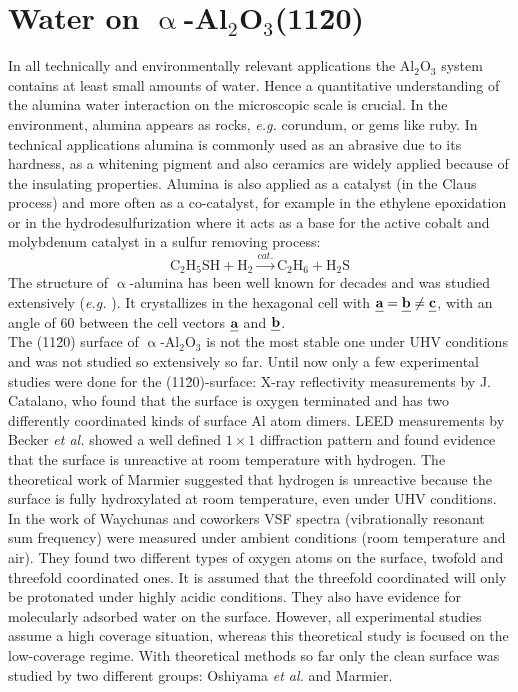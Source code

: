 \documentclass[11pt,DIV=13,BCOR=5mm,a4paper,headinclude]{scrbook}
\def\mathbi#1{\textbf{\em #1}}
\renewcommand{\vec}[1]{\mathbi{#1}}
\begin{document}
\chapter{Water on $\upalpha$-Al$_2$O$_3$(11\=20)}
In all technically and environmentally relevant applications the Al$_2$O$_3$ system contains at least small amounts of water.
Hence a quantitative understanding of the alumina water interaction on the microscopic scale is crucial.
In the environment, alumina appears as rocks, \textit{e.g.} corundum, or gems like ruby.
In technical applications alumina is commonly used as an abrasive due to its hardness, as a whitening pigment and also ceramics are widely applied because of the insulating properties.
Alumina is also applied as a catalyst (in the Claus process) and more often as a co-catalyst, for example in the ethylene epoxidation\cite{Oezbek2013} or in the hydrodesulfurization where it acts as a base for the active cobalt and molybdenum catalyst in a sulfur removing process:
\begin{equation*}
 \textrm{C}_2\textrm{H}_5\textrm{SH} + \textrm{H}_2  \xrightarrow{cat.} \textrm{C}_2\textrm{H}_6 + \textrm{H}_2\textrm{S}
\end{equation*}
The structure of $\upalpha$-alumina has been well known for decades and was studied extensively (\textit{e.g.} \cite{Passerini1930,wyckoff1931}).
It crystallizes in the hexagonal cell with $\vec{a}=\vec{b}\neq \vec{c}$, with an angle of $60$\textdegree{} between the cell vectors $\vec{a}$ and $\vec{b}$.
\\
The (11\=20) surface of $\upalpha$-Al$_2$O$_3$ is not the most stable one under UHV conditions and was not studied so extensively so far.
Until now only a few experimental studies were done for the (11\=20)-surface: X-ray reflectivity measurements by J. Catalano\cite{catalano}, who found that the surface is oxygen terminated and has two differently coordinated kinds of surface Al atom dimers.
LEED measurements by Becker \textit{et al.}\cite{Becker2002} showed a well defined $1\times 1$ diffraction pattern and found evidence that the surface is unreactive at room temperature with hydrogen.
The theoretical work of Marmier\cite{marmier} suggested that hydrogen is unreactive because the surface is fully hydroxylated at room temperature, even under UHV conditions.
In the work of Waychunas and coworkers\cite{sung} VSF spectra (vibrationally resonant sum frequency) were measured under ambient conditions (room temperature and air).
They found two different types of oxygen atoms on the surface, twofold and threefold coordinated ones.
It is assumed that the threefold coordinated will only be protonated under highly acidic conditions.
They also have evidence for molecularly adsorbed water on the surface.
However, all experimental studies\cite{catalano,sung,Becker2002} assume a high coverage situation, whereas this theoretical study is focused on the low-coverage regime.
With theoretical methods so far only the clean surface was studied by two different groups: Oshiyama \textit{et al.}\cite{kuri10} and Marmier\cite{marmier}.
\end{document}
